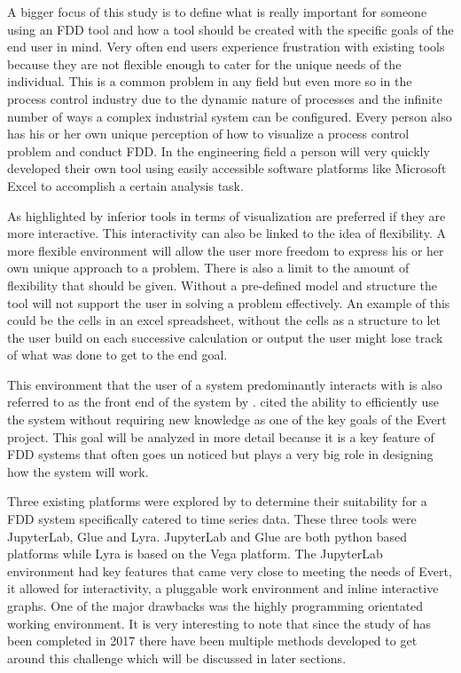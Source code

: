 A bigger focus of this study is to define what is really important for someone using an FDD tool and how a tool should be created with the specific goals of the end user in mind. Very often end users experience frustration with existing tools because they are not flexible enough to cater for the unique needs of the individual. This is a common problem in any field but even more so in the process control industry due to the dynamic nature of processes and the infinite number of ways a complex industrial system can be configured. Every person also has his or her own unique perception of how to visualize a process control problem and conduct FDD. In the engineering field a person will very quickly developed their own tool using easily accessible software platforms like Microsoft Excel to accomplish a certain analysis task.

As highlighted by \cite{saraiya2006insight} inferior tools in terms of visualization are preferred if they are more interactive. This interactivity can also be linked to the idea of flexibility. A more flexible environment will allow the user more freedom to express his or her own unique approach to a problem. There is also a limit to the amount of flexibility that should be given. Without a pre-defined model and structure the tool will not support the user in solving a problem effectively. An example of this could be the cells in an excel spreadsheet, without the cells as a structure to let the user build on each successive calculation or output the user might lose track of what was done to get to the end goal.

This environment that the user of a system predominantly interacts with is also referred to as the front end of the system by \cite{Herbst2017}. \cite{Herbst2017} cited the ability to efficiently use the system without requiring new knowledge as one of the key goals of the Evert project. This goal will be analyzed in more detail because it is a key feature of FDD systems that often goes un noticed but plays a very big role in designing how the system will work.

Three existing platforms were explored by \cite{Herbst2017} to determine their suitability for a FDD system specifically catered to time series data. These three tools were JupyterLab, Glue and Lyra. JupyterLab and Glue are both python based platforms while Lyra is based on the Vega platform. The JupyterLab environment had key features that came very close to meeting the needs of Evert, it allowed for interactivity, a pluggable work environment and inline interactive graphs. One of the major drawbacks was the highly programming orientated working environment. It is very interesting to note that since the study of \cite{Herbst2017} has been completed in 2017 there have been multiple methods developed to get around this challenge which will be discussed in later sections.


